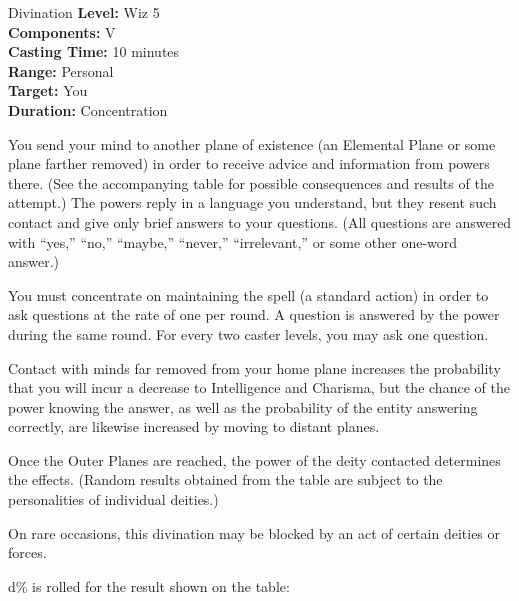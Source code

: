 {Divination}
{
	\textbf{Level:}
	Wiz 5\\
	\textbf{Components:}
	V\\
	\textbf{Casting Time:}
	10 minutes\\
	\textbf{Range:}
	Personal\\
	\textbf{Target:}
	You\\
	\textbf{Duration:}
	Concentration\\
}
{
	You send your mind to another plane of existence (an Elemental Plane or some plane farther removed) in order to receive advice and information from powers there. (See the accompanying table for possible consequences and results of the attempt.) The powers reply in a language you understand, but they resent such contact and give only brief answers to your questions. (All questions are answered with ``yes,'' ``no,'' ``maybe,'' ``never,'' ``irrelevant,'' or some other one-word answer.)

	You must concentrate on maintaining the spell (a standard action) in order to ask questions at the rate of one per round. A question is answered by the power during the same round. For every two caster levels, you may ask one question.

	Contact with minds far removed from your home plane increases the probability that you will incur a decrease to Intelligence and Charisma, but the chance of the power knowing the answer, as well as the probability of the entity answering correctly, are likewise increased by moving to distant planes.

	Once the Outer Planes are reached, the power of the deity contacted determines the effects. (Random results obtained from the table are subject to the personalities of individual deities.)

	On rare occasions, this divination may be blocked by an act of certain deities or forces.

	d\% is rolled for the result shown on the table:

}
